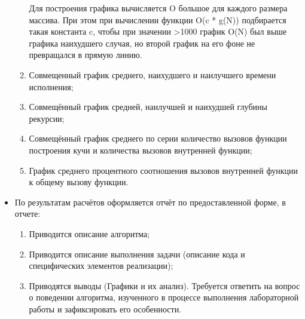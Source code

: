 \documentclass[12pt, a4paper]{report}
\begin{document}
\begin{itemize}
\begin{enumerate}
			Для построения графика вычисляется O большое для каждого размера массива. При этом при вычислении функции O(c * g(N)) подбирается такая константа c, чтобы при значении >1000 график O(N) был выше графика наихудшего случая, но второй график на его фоне не превращался в прямую линию.
			\item Совмещенный график среднего, наихудшего и наилучшего времени исполнения;
			\item Совмещённый график средней, наилучшей и наихудшей глубины рекурсии;
			\item Совмещённый график среднего по серии количество вызовов функции построения кучи и количества вызовов внутренней функции;
			\item График среднего процентного соотношения вызовов внутренней функции к общему вызову функции.
		\end{enumerate}
		\item По результатам расчётов оформляется отчёт по предоставленной форме, в отчете:
		\begin{enumerate}
			\item Приводится описание алгоритма;
			\item Приводится описание выполнения задачи (описание кода и специфических элементов реализации);
			\item Приводятся выводы (Графики и их анализ). Требуется ответить на вопрос о поведении алгоритма, изученного в процессе выполнения лабораторной работы и зафиксировать его особенности.
		\end{enumerate}
	\end{itemize}
\end{document}
